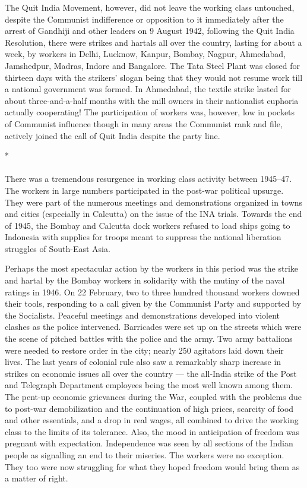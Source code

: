 The Quit India Movement, however, did not leave the working class untouched, despite the Communist indifference or opposition to it immediately after the arrest of Gandhiji and other leaders on 9 August 1942, following the Quit India Resolution, there were strikes and hartals all over the country, lasting for about a week, by workers in Delhi, Lucknow, Kanpur, Bombay, Nagpur, Ahmedabad, Jamshedpur, Madras, Indore and Bangalore. The Tata Steel Plant was closed for thirteen days with the strikers' slogan being that they would not resume work till a national government was formed. In Ahmedabad, the textile strike lasted for about three-and-a-half months with the mill owners in their nationalist euphoria actually cooperating! The participation of workers was, however, low in pockets of Communist influence though in many areas the Communist rank and file, actively joined the call of Quit India despite the party line.

\begin{center}*\end{center}

\paragraph*{}

There was a tremendous resurgence in working class activity between 1945--47. The workers in large numbers participated in the post-war political upsurge. They were part of the numerous meetings and demonstrations organized in towns and cities (especially in Calcutta) on the issue of the INA trials. Towards the end of 1945, the Bombay and Calcutta dock workers refused to load ships going to Indonesia with supplies for troops meant to suppress the national liberation struggles of South-East Asia.

Perhaps the most spectacular action by the workers in this period was the strike and hartal by the Bombay workers in solidarity with the mutiny of the naval ratings in 1946. On 22 February, two to three hundred thousand workers downed their tools, responding to a call given by the Communist Party and supported by the Socialists. Peaceful meetings and demonstrations developed into violent clashes as the police intervened. Barricades were set up on the streets which were the scene of pitched battles with the police and the army. Two army battalions were needed to restore order in the city; nearly 250 agitators laid down their lives. The last years of colonial rule also saw a remarkably sharp increase in strikes on economic issues all over the country --- the all-India strike of the Post and Telegraph Department employees being the most well known among them. The pent-up economic grievances during the War, coupled with the problems due to post-war demobilization and the continuation of high prices, scarcity of food and other essentials, and a drop in real wages, all combined to drive the working class to the limits of its tolerance. Also, the mood in anticipation of freedom was pregnant with expectation. Independence was seen by all sections of the Indian people as signalling an end to their miseries. The workers were no exception. They too were now struggling for what they hoped freedom would bring them as a matter of right.
